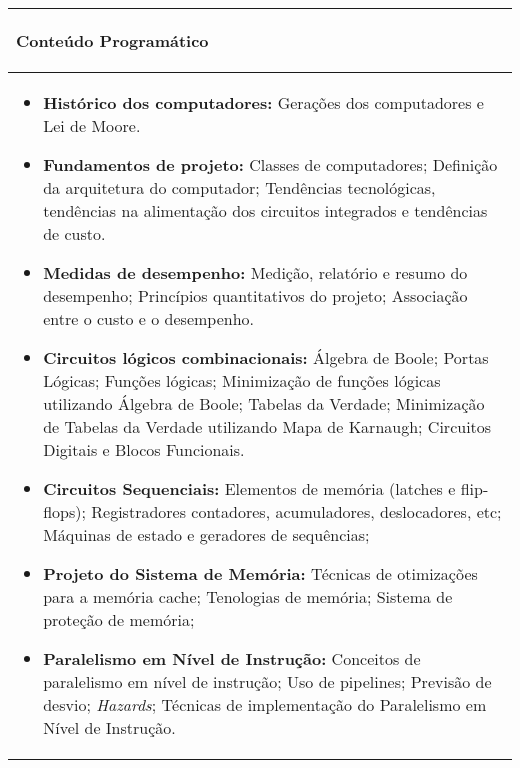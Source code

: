 \hspace{1cm}
\begin{table}[h]
\centering
\begin{small} 
\setlength{\tabcolsep}{3pt} 
\begin{tabular}{|p{15cm}|}\hline

\begin{center}\textbf{Conteúdo Programático}\end{center}\\ \hline
\begin{itemize}
 \item \textbf{Histórico dos computadores:} Gerações dos computadores e  Lei de Moore.
 \item \textbf{Fundamentos de projeto:} Classes de computadores; Definição da arquitetura do computador; Tendências tecnológicas, tendências na alimentação dos circuitos integrados e tendências de custo.
 \item \textbf{Medidas de desempenho:} Medição, relatório e resumo do desempenho; Princípios quantitativos do projeto; Associação entre o custo e o desempenho.
 \item \textbf{Circuitos lógicos combinacionais:} Álgebra de Boole; Portas Lógicas; Funções lógicas; Minimização de funções lógicas utilizando Álgebra de Boole; Tabelas da Verdade; Minimização de Tabelas da Verdade utilizando Mapa de Karnaugh;  Circuitos Digitais e Blocos Funcionais.
 \item \textbf{Circuitos Sequenciais:} Elementos de memória (latches e flip-flops); Registradores contadores, acumuladores, deslocadores, etc; Máquinas de estado e geradores de sequências; 
 \item \textbf{Projeto do Sistema de Memória:} Técnicas de otimizações para a memória cache; Tenologias de memória; Sistema de proteção de memória;
 \item \textbf{Paralelismo em Nível de Instrução:} Conceitos de paralelismo em nível de instrução; Uso de pipelines; Previsão de desvio; \textit{Hazards}; Técnicas de implementação do Paralelismo em Nível de Instrução. %
\end{itemize}
 \\ \hline

\end{tabular} 
\end{small}
\label{dadosinstituicao}
\end{table}


